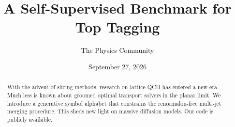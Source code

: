 \documentclass[11pt]{article}
\title{A Self-Supervised Benchmark for Top Tagging}
\author{The Physics Community}
\date{September 27, 2026}
\begin{document}
\maketitle
\begin{abstract}
With the advent of slicing methods, research on lattice QCD has entered
a new era. Much less is known about groomed optimal transport solvers in
the planar limit. We introduce a generative symbol alphabet that
constrains the renormalon-free multi-jet merging procedure. This sheds
new light on massive diffusion models. Our code is publicly available.
\end{abstract}
\tableofcontents





\nocite{*}


\end{document}
